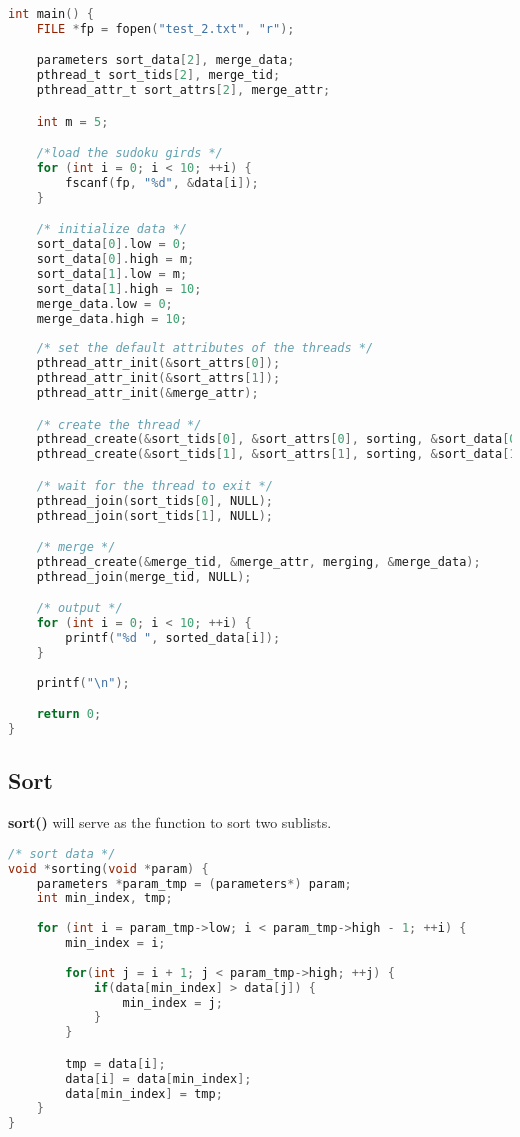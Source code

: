 \documentclass{article}
\begin{document}
\begin{lstlisting}[language=c, caption={main()}, captionpos=b]
int main() {
    FILE *fp = fopen("test_2.txt", "r");

    parameters sort_data[2], merge_data;
    pthread_t sort_tids[2], merge_tid;
    pthread_attr_t sort_attrs[2], merge_attr;

    int m = 5;

    /*load the sudoku girds */
	for (int i = 0; i < 10; ++i) {
		fscanf(fp, "%d", &data[i]);
	}

    /* initialize data */
    sort_data[0].low = 0;
    sort_data[0].high = m;
    sort_data[1].low = m;
    sort_data[1].high = 10;
    merge_data.low = 0;
    merge_data.high = 10;
    
    /* set the default attributes of the threads */
    pthread_attr_init(&sort_attrs[0]);
    pthread_attr_init(&sort_attrs[1]);
    pthread_attr_init(&merge_attr);

    /* create the thread */
    pthread_create(&sort_tids[0], &sort_attrs[0], sorting, &sort_data[0]);
    pthread_create(&sort_tids[1], &sort_attrs[1], sorting, &sort_data[1]);

    /* wait for the thread to exit */
    pthread_join(sort_tids[0], NULL);
    pthread_join(sort_tids[1], NULL);

    /* merge */
    pthread_create(&merge_tid, &merge_attr, merging, &merge_data);
    pthread_join(merge_tid, NULL);

    /* output */
    for (int i = 0; i < 10; ++i) {
        printf("%d ", sorted_data[i]);
    }
        
    printf("\n");

    return 0;
}
\end{lstlisting}

\subsection*{Sort}
\textbf{sort()} will serve as the function to sort two sublists.

\begin{lstlisting}[language=c, caption={Sort}, captionpos=b]
/* sort data */
void *sorting(void *param) {
    parameters *param_tmp = (parameters*) param;
    int min_index, tmp;
	
    for (int i = param_tmp->low; i < param_tmp->high - 1; ++i) {
		min_index = i;
		
        for(int j = i + 1; j < param_tmp->high; ++j) {
			if(data[min_index] > data[j]) {
				min_index = j;
			}
		}

		tmp = data[i];
		data[i] = data[min_index];
		data[min_index] = tmp;
	}
}
\end{lstlisting}
\end{document}
